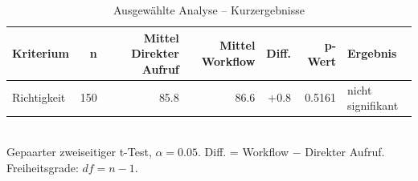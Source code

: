 \begin{table}[htbp]
\centering
\caption{Ausgewählte Analyse -- Kurzergebnisse}
\begin{tabular}{lrrrrrl}
\toprule
Kriterium & n & Mittel Direkter Aufruf & Mittel Workflow & Diff. & p-Wert & Ergebnis \\
\midrule
Richtigkeit & 150 & 85.8 & 86.6 & +0.8 & 0.5161 & nicht signifikant \\
\bottomrule
\end{tabular}
\\[2mm]
\footnotesize Gepaarter zweiseitiger t-Test, $\alpha=0.05$. Diff. = Workflow $-$ Direkter Aufruf. Freiheitsgrade: $df=n-1$.
\end{table}
